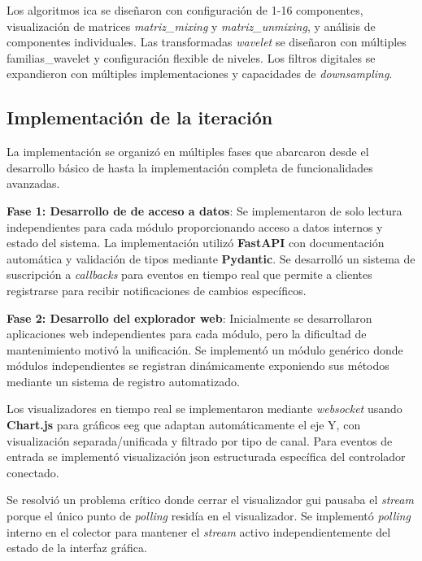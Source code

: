 Los algoritmos \acrshort{ica} se diseñaron con configuración de 1-16 componentes, visualización de matrices \textit{\gls{matriz_mixing}} y \textit{\gls{matriz_unmixing}}, y análisis de componentes individuales. Las transformadas \textit{\gls{wavelet}} se diseñaron con múltiples \gls{familias_wavelet} y configuración flexible de niveles. Los filtros digitales se expandieron con múltiples implementaciones y capacidades de \textit{\gls{downsampling}}.

\subsection{Implementación de la iteración}
\label{subsec:implementacion_iteracion_3}

La implementación se organizó en múltiples fases que abarcaron desde el desarrollo básico de  hasta la implementación completa de funcionalidades avanzadas.

\textbf{Fase 1: Desarrollo de  de acceso a datos}:
Se implementaron  de solo lectura independientes para cada módulo proporcionando acceso a datos internos y estado del sistema. La implementación utilizó \textbf{FastAPI} con documentación automática y validación de tipos mediante \textbf{Pydantic}. Se desarrolló un sistema de suscripción a \textit{\glspl{callback}} para eventos en tiempo real que permite a clientes registrarse para recibir notificaciones de cambios específicos.

\textbf{Fase 2: Desarrollo del explorador web}:
Inicialmente se desarrollaron aplicaciones web independientes para cada módulo, pero la dificultad de mantenimiento motivó la unificación. Se implementó un módulo genérico donde módulos independientes se registran dinámicamente exponiendo sus métodos mediante un sistema de registro automatizado.

Los visualizadores en tiempo real se implementaron mediante \textit{\gls{websocket}} usando \textbf{Chart.js} para gráficos \acrshort{eeg} que adaptan automáticamente el eje Y, con visualización separada/unificada y filtrado por tipo de canal. Para eventos de entrada se implementó visualización \acrshort{json} estructurada específica del controlador conectado.

Se resolvió un problema crítico donde cerrar el visualizador \acrshort{gui} pausaba el \textit{\gls{stream}} porque el único punto de \textit{\gls{polling}} residía en el visualizador. Se implementó \textit{\gls{polling}} interno en el colector para mantener el \textit{\gls{stream}} activo independientemente del estado de la interfaz gráfica.

